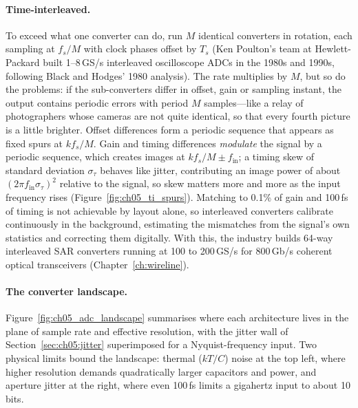 \paragraph{Time-interleaved.} To exceed what one converter can do, run $M$ identical converters
in rotation, each sampling at $f_s/M$ with clock phases offset by $T_s$ (Ken Poulton's team at
Hewlett-Packard built 1--8\,GS/s interleaved oscilloscope ADCs in the 1980s and 1990s, following
Black and Hodges' 1980 analysis). The rate multiplies by $M$, but so do the problems: if the
sub-converters differ in offset, gain or sampling instant, the output contains periodic errors
with period $M$ samples---like a relay of photographers whose cameras are not quite identical,
so that every fourth picture is a little brighter. Offset differences form a periodic sequence that
appears as fixed spurs at $kf_s/M$. Gain and timing differences \emph{modulate} the signal by a
periodic sequence, which creates images at $kf_s/M\pm f_{\text{in}}$; a timing skew of standard
deviation $\sigma_\tau$ behaves like jitter, contributing an image power of about
$(2\pi f_{\text{in}}\sigma_\tau)^2$ relative to the signal, so skew matters more and more as the input
frequency rises (Figure~\ref{fig:ch05_ti_spurs}). Matching to 0.1\% of gain and 100\,fs of timing is
not achievable by layout alone, so interleaved converters calibrate continuously in the background,
estimating the mismatches from the signal's own statistics and correcting them digitally. With
this, the industry builds 64-way interleaved SAR converters running at 100 to 200\,GS/s for
800\,Gb/s coherent optical transceivers (Chapter~\ref{ch:wireline}).


\paragraph{The converter landscape.} Figure~\ref{fig:ch05_adc_landscape} summarises where each
architecture lives in the plane of sample rate and effective resolution, with the jitter wall of
Section~\ref{sec:ch05:jitter} superimposed for a Nyquist-frequency input. Two physical limits
bound the landscape: thermal ($kT/C$) noise at the top left, where higher resolution demands
quadratically larger capacitors and power, and aperture jitter at the right, where even 100\,fs
limits a gigahertz input to about 10 bits.

